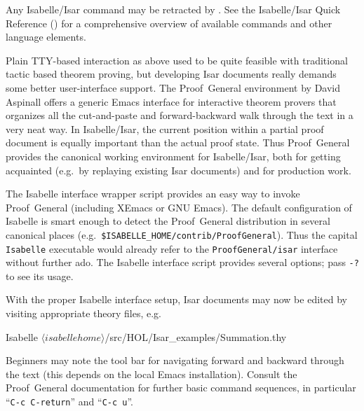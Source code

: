 \begin{isabellebody}
\begin{isamarkuptext}
  Any Isabelle/Isar command may be retracted by \hyperlink{command.undo}{\mbox{}}.
  See the Isabelle/Isar Quick Reference () for a
  comprehensive overview of available commands and other language
  elements.%
\end{isamarkuptext}%
\isamarkuptrue%
%
\isamarkuptrue%
%
\begin{isamarkuptext}%
Plain TTY-based interaction as above used to be quite feasible with
  traditional tactic based theorem proving, but developing Isar
  documents really demands some better user-interface support.  The
  Proof~General environment by David Aspinall
  \cite{proofgeneral,Aspinall:TACAS:2000} offers a generic Emacs
  interface for interactive theorem provers that organizes all the
  cut-and-paste and forward-backward walk through the text in a very
  neat way.  In Isabelle/Isar, the current position within a partial
  proof document is equally important than the actual proof state.
  Thus Proof~General provides the canonical working environment for
  Isabelle/Isar, both for getting acquainted (e.g.\ by replaying
  existing Isar documents) and for production work.%
\end{isamarkuptext}%
\isamarkuptrue%
%
\isamarkuptrue%
%
\begin{isamarkuptext}%
The Isabelle interface wrapper script provides an easy way to invoke
  Proof~General (including XEmacs or GNU Emacs).  The default
  configuration of Isabelle is smart enough to detect the
  Proof~General distribution in several canonical places (e.g.\
  \verb|$ISABELLE_HOME/contrib/ProofGeneral|).  Thus the
  capital \verb|Isabelle| executable would already refer to the
  \verb|ProofGeneral/isar| interface without further ado.  The
  Isabelle interface script provides several options; pass \verb|-?|  to see its usage.

  With the proper Isabelle interface setup, Isar documents may now be edited by
  visiting appropriate theory files, e.g.\ 
\begin{ttbox}
Isabelle \({\langle}isabellehome{\rangle}\)/src/HOL/Isar_examples/Summation.thy
\end{ttbox}
  Beginners may note the tool bar for navigating forward and backward
  through the text (this depends on the local Emacs installation).
  Consult the Proof~General documentation \cite{proofgeneral} for
  further basic command sequences, in particular ``\verb|C-c C-return|''
  and ``\verb|C-c u|''.


\end{isamarkuptext}
\end{isabellebody}
